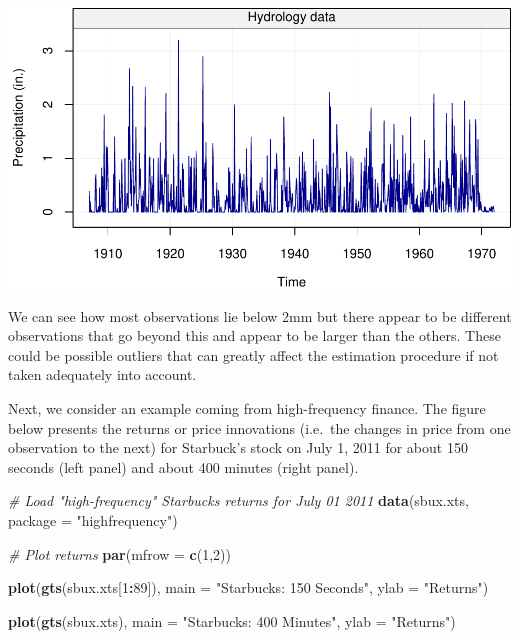 \documentclass[]{book}
\newenvironment{Shaded}{\begin{snugshade}}{\end{snugshade}}
\newcommand{\KeywordTok}[1]{\textcolor[rgb]{0.13,0.29,0.53}{\textbf{#1}}}
\newcommand{\DataTypeTok}[1]{\textcolor[rgb]{0.13,0.29,0.53}{#1}}
\newcommand{\DecValTok}[1]{\textcolor[rgb]{0.00,0.00,0.81}{#1}}
\newcommand{\StringTok}[1]{\textcolor[rgb]{0.31,0.60,0.02}{#1}}
\newcommand{\CommentTok}[1]{\textcolor[rgb]{0.56,0.35,0.01}{\textit{#1}}}
\newcommand{\OperatorTok}[1]{\textcolor[rgb]{0.81,0.36,0.00}{\textbf{#1}}}
\newcommand{\NormalTok}[1]{#1}
\theoremstyle{definition}
\theoremstyle{definition}
\theoremstyle{definition}
\theoremstyle{remark}
\begin{document}
\begin{center}\includegraphics{ts_files/figure-latex/example_hydro-1} \end{center}

We can see how most observations lie below 2mm but there appear to be
different observations that go beyond this and appear to be larger than
the others. These could be possible outliers that can greatly affect the
estimation procedure if not taken adequately into account.

Next, we consider an example coming from high-frequency finance. The
figure below presents the returns or price innovations (i.e.~the changes
in price from one observation to the next) for Starbuck's stock on July
1, 2011 for about 150 seconds (left panel) and about 400 minutes (right
panel).

\begin{Shaded}
\begin{Highlighting}[]
\CommentTok{# Load "high-frequency" Starbucks returns for July 01 2011}
\KeywordTok{data}\NormalTok{(sbux.xts, }\DataTypeTok{package =} \StringTok{"highfrequency"}\NormalTok{)}

\CommentTok{# Plot returns}
\KeywordTok{par}\NormalTok{(}\DataTypeTok{mfrow =} \KeywordTok{c}\NormalTok{(}\DecValTok{1}\NormalTok{,}\DecValTok{2}\NormalTok{))}

\KeywordTok{plot}\NormalTok{(}\KeywordTok{gts}\NormalTok{(sbux.xts[}\DecValTok{1}\OperatorTok{:}\DecValTok{89}\NormalTok{]), }
     \DataTypeTok{main =} \StringTok{"Starbucks: 150 Seconds"}\NormalTok{, }
     \DataTypeTok{ylab =} \StringTok{"Returns"}\NormalTok{) }

\KeywordTok{plot}\NormalTok{(}\KeywordTok{gts}\NormalTok{(sbux.xts), }
     \DataTypeTok{main =} \StringTok{"Starbucks: 400 Minutes"}\NormalTok{, }
     \DataTypeTok{ylab =} \StringTok{"Returns"}\NormalTok{)}
\end{Highlighting}
\end{Shaded}
\end{document}
